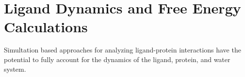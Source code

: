 \section{Ligand Dynamics and Free Energy Calculations}
  
Simultation based approaches for analyzing ligand-protein interactions have the potential to fully account for the dynamics of the ligand, protein, and water system.


